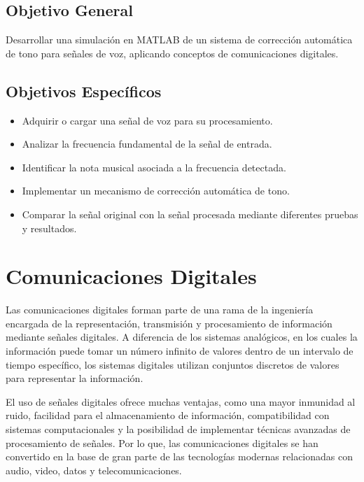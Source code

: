\documentclass[12pt]{article}
\begin{document}

\subsection{Objetivo General}

Desarrollar una simulación en MATLAB de un sistema de corrección automática de tono para señales de voz, aplicando conceptos de comunicaciones digitales.

\subsection{Objetivos Específicos}

\begin{itemize}
    \item Adquirir o cargar una señal de voz para su procesamiento.
    \item Analizar la frecuencia fundamental de la señal de entrada.
    \item Identificar la nota musical asociada a la frecuencia detectada.
    \item Implementar un mecanismo de corrección automática de tono.
    \item Comparar la señal original con la señal procesada mediante diferentes pruebas y resultados.
\end{itemize}



\section{Comunicaciones Digitales}

Las comunicaciones digitales forman parte de una rama de la ingeniería encargada de la representación, transmisión y procesamiento de información mediante señales digitales. A diferencia de los sistemas analógicos, en los cuales la información puede tomar un número infinito de valores dentro de un intervalo de tiempo específico, los sistemas digitales utilizan conjuntos discretos de valores para representar la información.

El uso de señales digitales ofrece muchas ventajas, como una mayor inmunidad al ruido, facilidad para el almacenamiento de información, compatibilidad con sistemas computacionales y la posibilidad de implementar técnicas avanzadas de procesamiento de señales. Por lo que, las comunicaciones digitales se han convertido en la base de gran parte de las tecnologías modernas relacionadas con audio, video, datos y telecomunicaciones.
\end{document}
